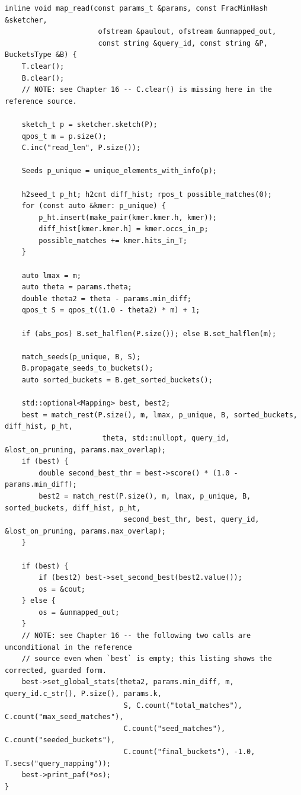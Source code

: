 \begin{lstlisting}[style=cppstyle,caption={\code{map\_read}, \texttt{src/shmap.h} --- core structure (elided: verbose-mode/diagnostic branches, identical in spirit to the pseudocode above)}]
inline void map_read(const params_t &params, const FracMinHash &sketcher,
                      ofstream &paulout, ofstream &unmapped_out,
                      const string &query_id, const string &P, BucketsType &B) {
    T.clear();
    B.clear();
    // NOTE: see Chapter 16 -- C.clear() is missing here in the reference source.

    sketch_t p = sketcher.sketch(P);
    qpos_t m = p.size();
    C.inc("read_len", P.size());

    Seeds p_unique = unique_elements_with_info(p);

    h2seed_t p_ht; h2cnt diff_hist; rpos_t possible_matches(0);
    for (const auto &kmer: p_unique) {
        p_ht.insert(make_pair(kmer.kmer.h, kmer));
        diff_hist[kmer.kmer.h] = kmer.occs_in_p;
        possible_matches += kmer.hits_in_T;
    }

    auto lmax = m;
    auto theta = params.theta;
    double theta2 = theta - params.min_diff;
    qpos_t S = qpos_t((1.0 - theta2) * m) + 1;

    if (abs_pos) B.set_halflen(P.size()); else B.set_halflen(m);

    match_seeds(p_unique, B, S);
    B.propagate_seeds_to_buckets();
    auto sorted_buckets = B.get_sorted_buckets();

    std::optional<Mapping> best, best2;
    best = match_rest(P.size(), m, lmax, p_unique, B, sorted_buckets, diff_hist, p_ht,
                       theta, std::nullopt, query_id, &lost_on_pruning, params.max_overlap);
    if (best) {
        double second_best_thr = best->score() * (1.0 - params.min_diff);
        best2 = match_rest(P.size(), m, lmax, p_unique, B, sorted_buckets, diff_hist, p_ht,
                            second_best_thr, best, query_id, &lost_on_pruning, params.max_overlap);
    }

    if (best) {
        if (best2) best->set_second_best(best2.value());
        os = &cout;
    } else {
        os = &unmapped_out;
    }
    // NOTE: see Chapter 16 -- the following two calls are unconditional in the reference
    // source even when `best` is empty; this listing shows the corrected, guarded form.
    best->set_global_stats(theta2, params.min_diff, m, query_id.c_str(), P.size(), params.k,
                            S, C.count("total_matches"), C.count("max_seed_matches"),
                            C.count("seed_matches"), C.count("seeded_buckets"),
                            C.count("final_buckets"), -1.0, T.secs("query_mapping"));
    best->print_paf(*os);
}
\end{lstlisting}
